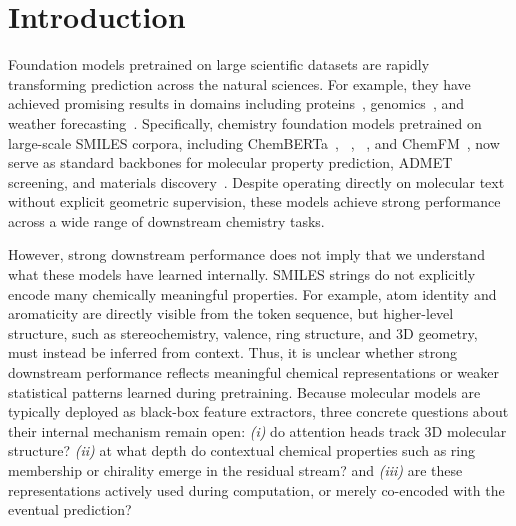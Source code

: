 \section{Introduction}
\label{sec:intro}


Foundation models pretrained on large scientific datasets are rapidly transforming prediction across the natural sciences. For example, they have achieved promising results in domains including proteins~\citep{lin2023esm2,jumper2021highly}, genomics~\citep{nguyen2024evo}, and weather forecasting~\citep{lam2023graphcast}. Specifically, chemistry foundation models pretrained on large-scale SMILES corpora, including ChemBERTa~\citep{chithrananda2020chemberta}, \molm~\citep{ross2022largescalechemicallanguagerepresentations}, \smi~\citep{soares2024smi}, and ChemFM~\citep{cai2026chemfm}, now serve as standard backbones for molecular property prediction, ADMET screening, and materials discovery~\citep{wu2018moleculenet,harod2025effichem,sharma2025foundation}. Despite operating directly on molecular text without explicit geometric supervision, these models achieve strong performance across a wide range of downstream chemistry tasks.

However, strong downstream performance does not imply that we understand what these models have learned internally. SMILES strings do not explicitly encode many chemically meaningful properties. For example, atom identity and aromaticity are directly visible from the token sequence, but higher-level structure, such as stereochemistry, valence, ring structure, and 3D geometry, must instead be inferred from context. Thus, it is unclear whether strong downstream performance reflects meaningful chemical representations or weaker statistical patterns learned during pretraining. Because molecular models are typically deployed as black-box feature extractors, three concrete questions about their internal mechanism remain open: \emph{(i)} do attention heads track 3D molecular structure? \emph{(ii)} at what depth do contextual chemical properties such as ring membership or chirality emerge in the residual stream? and \emph{(iii)} are these representations actively used during computation, or merely co-encoded with the eventual prediction?


